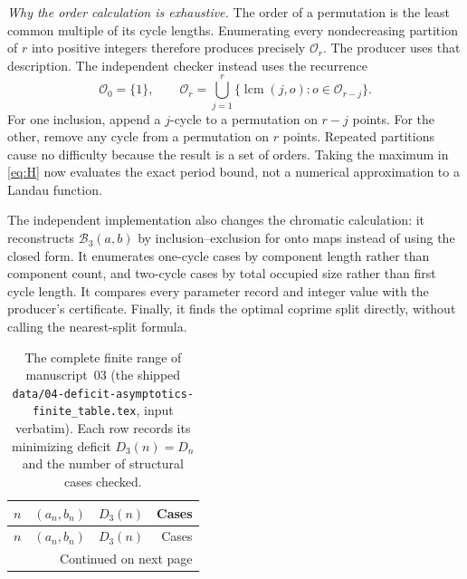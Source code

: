 \documentclass[11pt,a4paper]{article}
\numberwithin{equation}{section}
\theoremstyle{definition}
\theoremstyle{remark}
\newcommand{\lcm}{\operatorname{lcm}}
\newcommand{\Bip}{\mathcal B}
\begin{document}
\emph{Why the order calculation is exhaustive.} The order of a permutation is
the least common multiple of its cycle lengths. Enumerating every
nondecreasing partition of $r$ into positive integers therefore produces
precisely $\mathcal O_r$. The producer uses that description. The independent
checker instead uses the recurrence
\begin{equation}\label{evo:da:eq:ordersdp}
 \mathcal O_0=\{1\},\qquad
 \mathcal O_r=\bigcup_{j=1}^r\{\lcm(j,o):o\in\mathcal O_{r-j}\}.
\end{equation}
For one inclusion, append a $j$-cycle to a permutation on $r-j$ points. For
the other, remove any cycle from a permutation on $r$ points. Repeated
partitions cause no difficulty because the result is a set of orders. Taking
the maximum in \eqref{eq:H} now evaluates the exact period bound, not a
numerical approximation to a Landau function.

The independent implementation also changes the chromatic calculation: it
reconstructs $\Bip_3(a,b)$ by inclusion--exclusion for onto maps instead of
using the closed form. It enumerates one-cycle cases by component length
rather than component count, and two-cycle cases by total occupied size
rather than first cycle length. It compares every parameter record and
integer value with the producer's certificate. Finally, it finds the optimal
coprime split directly, without calling the nearest-split formula.

\begin{center}
\small
\begin{longtable}{@{}rrrr@{}}
\caption{The complete finite range of manuscript~03 (the shipped
\texttt{data/04-deficit-asymptotics-finite\_table.tex}, input verbatim). Each
row records its minimizing deficit $D_3(n)=D_n$ and the number of structural
cases checked.}\label{evo:da:tab:finite}\\
\toprule
$n$ & $(a_n,b_n)$ & $D_3(n)$ & Cases\\
\midrule\endfirsthead
\toprule $n$ & $(a_n,b_n)$ & $D_3(n)$ & Cases\\\midrule\endhead
\midrule\multicolumn{4}{r}{Continued on next page}\endfoot
\bottomrule\endlastfoot

\end{longtable}
\end{center}
\end{document}
